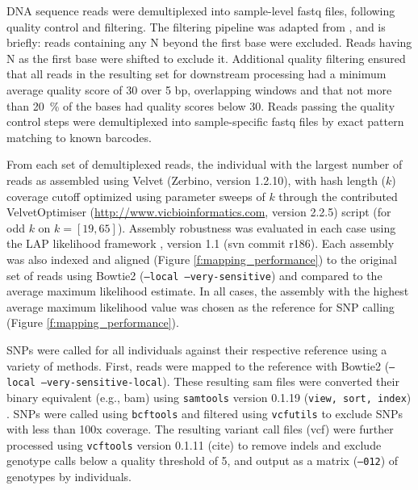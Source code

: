 \documentclass[11pt]{article}
\begin{document}
DNA sequence reads were demultiplexed into sample-level fastq files, following quality control 
and filtering.  The filtering pipeline was adapted from \citep{Friedline:2012fm}, and is briefly: reads 
containing any N beyond the first base were excluded. Reads having N as the first base were shifted 
to exclude it.  Additional quality filtering ensured that all reads in the resulting set for downstream 
processing had a minimum average quality score of 30 over 5 bp, overlapping windows 
and that not more than \SI{20}{\percent} of the bases had quality scores below 30. Reads passing the 
quality control steps were demultiplexed into sample-specific fastq files by exact pattern matching to 
known barcodes.

From each set of demultiplexed reads, the individual with the largest number of reads as assembled using 
Velvet (Zerbino, version 1.2.10), with hash length ($k$) coverage cutoff optimized using parameter sweeps of $k$ 
through the contributed VelvetOptimiser (\url{http://www.vicbioinformatics.com}, version 2.2.5) 
script (for odd $k$ on $k=[19,65]$).  Assembly robustness was evaluated in each case using the LAP likelihood 
framework \citep{Ghodsi:2013bc}, version 1.1 (svn commit r186).  Each assembly was also indexed and aligned 
(Figure \ref{f:mapping_performance}) to the original set of reads 
using Bowtie2 \citep{Langmead:2012jh} (\texttt{--local --very-sensitive}) and compared to the average maximum 
likelihood estimate. In all cases, the assembly with the highest average maximum likelihood value was 
chosen as the reference for SNP calling (Figure \ref{f:mapping_performance}).

SNPs were called for all individuals against their respective reference using a variety of methods.  First, 
reads were mapped to the reference with Bowtie2 (\texttt{--local --very-sensitive-local}).  These resulting 
sam files were converted their binary equivalent (e.g., bam) using \texttt{samtools} version 0.1.19 
(\texttt{view, sort, index}) \citep{Li:2009ka}.  SNPs were called using \texttt{bcftools} and filtered using 
\texttt{vcfutils} to exclude SNPs with less than 100x coverage. The resulting variant call files (vcf) 
were further processed using \texttt{vcftools} version 0.1.11 (cite) to remove indels and exclude genotype 
calls below a quality threshold of 5, and output as a matrix (\texttt{--012}) of genotypes by individuals.  
\end{document}
